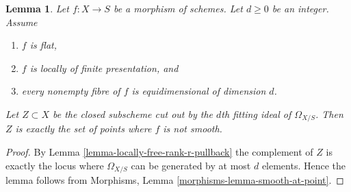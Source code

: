 \documentclass[10pt,a4paper]{amsart}
\theoremstyle{plain}
\newtheorem{lemma}[subsection]{Lemma}
\theoremstyle{definition}
\theoremstyle{remark}
\numberwithin{equation}{subsection}
\begin{document}
\begin{lemma}
\label{lemma-d-fitting-ideal-omega-smooth}
Let $f : X \to S$ be a morphism of schemes. Let $d \geq 0$ be an integer.
Assume
\begin{enumerate}
\item $f$ is flat,
\item $f$ is locally of finite presentation, and
\item every nonempty fibre of $f$ is equidimensional of dimension $d$.
\end{enumerate}
Let $Z \subset X$ be the closed subscheme cut out by the $d$th fitting
ideal of $\Omega_{X/S}$. Then $Z$ is exactly the set of points
where $f$ is not smooth.
\end{lemma}

\begin{proof}
By Lemma \ref{lemma-locally-free-rank-r-pullback} the complement of $Z$
is exactly the locus where $\Omega_{X/S}$ can be generated by at most
$d$ elements. Hence the lemma follows from
Morphisms, Lemma \ref{morphisms-lemma-smooth-at-point}.
\end{proof}
\end{document}
